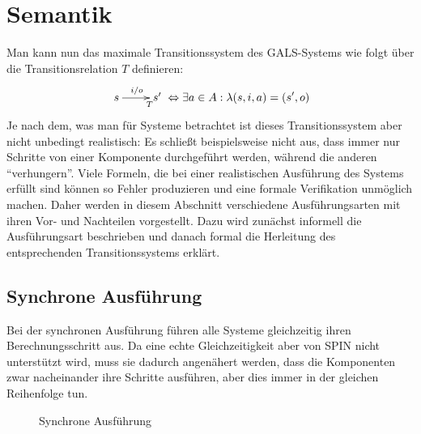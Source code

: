 \section{Semantik}
\label{sec:semantic}
Man kann nun das maximale Transitionssystem des GALS-Systems wie folgt über die Transitionsrelation $T$ definieren:
\[ \xymatrix { s \ar[r]^{i/o}_>T & s' } \Leftrightarrow \exists a\in A: \lambda(s,i,a) = (s',o) \]
Je nach dem, was man für Systeme betrachtet ist dieses Transitionssystem aber nicht unbedingt realistisch:
Es schließt beispielsweise nicht aus, dass immer nur Schritte von einer Komponente durchgeführt werden, während die anderen "`verhungern"'.
Viele Formeln, die bei einer realistischen Ausführung des Systems erfüllt sind können so Fehler produzieren und eine formale Verifikation unmöglich machen.
Daher werden in diesem Abschnitt verschiedene Ausführungsarten mit ihren Vor- und Nachteilen vorgestellt.
Dazu wird zunächst informell die Ausführungsart beschrieben und danach formal die Herleitung des entsprechenden Transitionssystems erklärt.

\subsection{Synchrone Ausführung}
Bei der synchronen Ausführung führen alle Systeme gleichzeitig ihren Berechnungsschritt aus.
Da eine echte Gleichzeitigkeit aber von SPIN nicht unterstützt wird, muss sie dadurch angenähert werden, dass die Komponenten zwar nacheinander ihre Schritte ausführen, aber dies  immer in der gleichen Reihenfolge tun.

\begin{figure}[h]
  \centering
  \caption{Synchrone Ausführung}
  \label{fig:synchronized_execution}
\end{figure}

